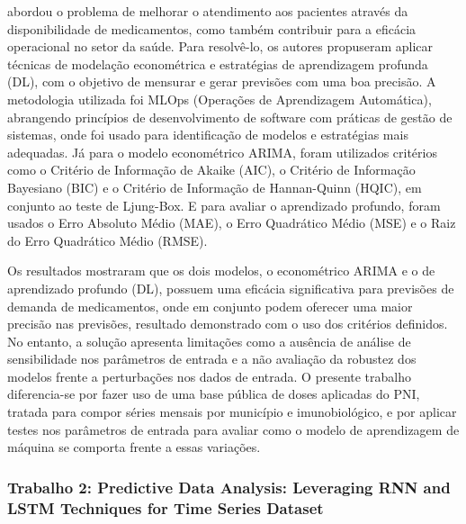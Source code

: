 \documentclass[
    12pt,
    openright,
    oneside,
    a4paper,
    english,
    brazil
]{abntex2}
\begin{document}
 abordou o problema de melhorar o atendimento aos pacientes através da disponibilidade de medicamentos, como também contribuir para a eficácia operacional no setor da saúde. Para resolvê-lo, os autores propuseram aplicar técnicas de modelação econométrica e estratégias de aprendizagem profunda (DL), com o objetivo de mensurar e gerar previsões com uma boa precisão. A metodologia utilizada foi MLOps (Operações de Aprendizagem Automática), abrangendo princípios de desenvolvimento de software com práticas de gestão de sistemas, onde foi usado para identificação de modelos e estratégias mais adequadas. Já para o modelo econométrico ARIMA, foram utilizados critérios como o Critério de Informação de Akaike (AIC), o Critério de Informação Bayesiano (BIC) e o Critério de Informação de Hannan-Quinn (HQIC), em conjunto ao teste de Ljung-Box. E para avaliar o aprendizado profundo, foram usados o Erro Absoluto Médio (MAE), o Erro Quadrático Médio (MSE) e o Raiz do Erro Quadrático Médio (RMSE).

Os resultados mostraram que os dois modelos, o econométrico ARIMA e o de aprendizado profundo (DL), possuem uma eficácia significativa para previsões de demanda de medicamentos, onde em conjunto podem oferecer uma maior precisão nas previsões, resultado demonstrado com o uso dos critérios definidos. No entanto, a solução apresenta limitações como a ausência de análise de sensibilidade nos parâmetros de entrada e a não avaliação da robustez dos modelos frente a perturbações nos dados de entrada. O presente trabalho diferencia-se por fazer uso de uma base pública de doses aplicadas do PNI, tratada para compor séries mensais por município e imunobiológico, e por aplicar testes nos parâmetros de entrada para avaliar como o modelo de aprendizagem de máquina se comporta frente a essas variações.

\subsubsection{Trabalho 2: Predictive Data Analysis: Leveraging RNN and LSTM Techniques for Time Series Dataset}
\end{document}
